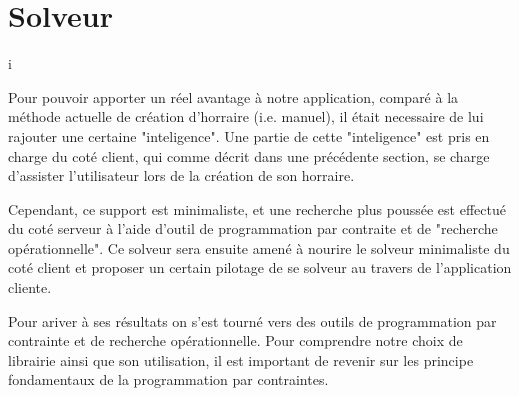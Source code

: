 \chapter{Solveur}
i%





Pour pouvoir apporter un réel avantage à notre application, comparé à la méthode actuelle de création d'horraire (i.e. manuel), il était necessaire de lui rajouter une certaine "inteligence". 
Une partie de cette "inteligence" est pris en charge du coté client, qui comme décrit dans une précédente section, se charge d'assister l'utilisateur lors de la création de son horraire.

Cependant, ce support est minimaliste, et une recherche plus poussée est effectué du coté serveur à l'aide d'outil de programmation par contraite et de "recherche opérationnelle".  Ce solveur sera ensuite amené à nourire le solveur minimaliste du coté client et proposer un certain pilotage de se solveur au travers de l'application cliente. 

Pour ariver à ses résultats on s'est tourné vers des outils de programmation par contrainte et de recherche opérationnelle. 
Pour comprendre notre choix de librairie ainsi que son utilisation, il est important de revenir sur les principe fondamentaux de la programmation par contraintes.


